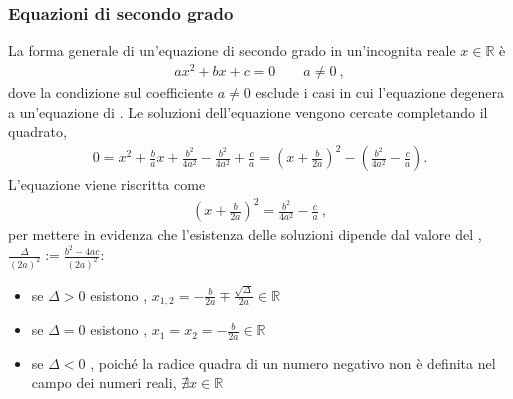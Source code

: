 \documentclass[letterpaper,10pt,italian]{jupyterBook}
\begin{document}
\subsubsection{Equazioni di secondo grado}
\label{\detokenize{ch/algebra/real-algebra:equazioni-di-secondo-grado}}\label{\detokenize{ch/algebra/real-algebra:math-hs-algebra-real-eq-second}}
\sphinxAtStartPar
La forma generale di un’equazione di secondo grado in un’incognita reale \(x \in \mathbb{R}\) è
\begin{equation*}
\begin{split}a x^2 + b x + c = 0 \qquad a \ne 0 \ ,\end{split}
\end{equation*}
\sphinxAtStartPar
dove la condizione sul coefficiente \(a \ne 0\) esclude i casi in cui l’equazione degenera a un’equazione di {\hyperref[\detokenize{ch/algebra/real-algebra:math-hs-algebra-real-eq-first}]{}}.
Le soluzioni dell’equazione vengono cercate completando il quadrato,
\begin{equation*}
\begin{split}0 = x^2 + \frac{b}{a} x + \frac{b^2}{4 a^2} - \frac{b^2}{4 a^2} + \frac{c}{a} = \left( x + \frac{b}{2a} \right)^2 - \left( \frac{b^2}{4 a^2} - \frac{c}{a} \right) . \end{split}
\end{equation*}
\sphinxAtStartPar
L’equazione viene riscritta come
\begin{equation*}
\begin{split}\left( x + \frac{b}{2a} \right)^2 = \frac{b^2}{4 a^2} - \frac{c}{a} \ ,\end{split}
\end{equation*}
\sphinxAtStartPar
per mettere in evidenza che l’esistenza delle soluzioni dipende dal valore del , \(\frac{\Delta}{(2a)^2} := \frac{b^2 - 4 a c}{(2a)^2}\):
\begin{itemize}
\item {} 
\sphinxAtStartPar
se \(\Delta > 0\) esistono , \(x_{1,2} = - \frac{b}{2a} \mp \frac{\sqrt{\Delta}}{2a} \in \mathbb{R}\)

\item {} 
\sphinxAtStartPar
se \(\Delta = 0\) esistono , \(x_1 = x_2 = - \frac{b}{2a} \in \mathbb{R}\)

\item {} 
\sphinxAtStartPar
se \(\Delta < 0\) , poiché la radice quadra di un numero negativo non è definita nel campo dei numeri reali, \(\nexists x \in \mathbb{R}\)

\end{itemize}
\end{document}
